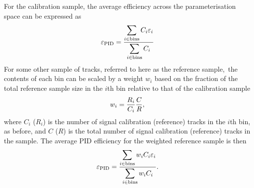 For the calibration sample, the average efficiency across the parameterisation 
space can be expressed as
\begin{equation}
  \effpid = \frac{%
    \displaystyle\sum_{i \in \textnormal{bins}} C_{i}\eff_{i}
    }{%
    \displaystyle\sum_{i \in \textnormal{bins}} C_{i}
    }
\end{equation}
For some other sample of tracks, referred to here as the reference 
sample,\footnotemark\ the contents of each bin can be scaled by a weight 
$w_{i}$ based on the fraction of the total reference sample size in the $i$th 
bin relative to that of the calibration sample
\begin{equation}
  w_{i} = \frac{%
    R_{i}
  }{%
    C_{i}
  }\frac{%
    C
  }{%
    R
  },
  \label{eqn:prod:effs:pid:ref_weight}
\end{equation}
where $C_{i}$ ($R_{i}$) is the number of signal calibration (reference) tracks 
in the $i$th bin, as before, and $C$ ($R$) is the total number of signal 
calibration (reference) tracks in the sample.
The average \ac{PID} efficiency for the weighted reference sample is then
\begin{equation}
  \effpid = \frac{%
    \displaystyle\sum_{i \in \textnormal{bins}} w_{i}C_{i}\eff_{i}
  }{%
    \displaystyle\sum_{i \in \textnormal{bins}} w_{i}C_{i}
  }.
  \label{eqn:prod:effs:pid:single_track_ref_eff}
\end{equation}


